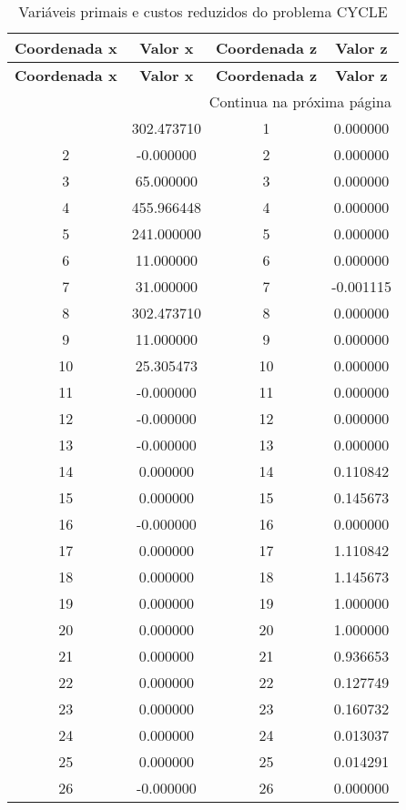 \documentclass[12pt]{article}
\begin{document}
\begin{longtable}{@{}cccc@{}}
\caption{Variáveis primais e custos reduzidos do problema CYCLE} \\
\toprule
\textbf{Coordenada x} & \textbf{Valor x} & \textbf{Coordenada z} & \textbf{Valor z} \\
\midrule
\endfirsthead

\toprule
\textbf{Coordenada x} & \textbf{Valor x} & \textbf{Coordenada z} & \textbf{Valor z} \\
\midrule
\endhead

\midrule \multicolumn{4}{r}{{Continua na próxima página}} \\ \midrule
\endfoot

\bottomrule
\endlastfoot
1 & 302.473710 & 1 & 0.000000 \\
2 & -0.000000 & 2 & 0.000000 \\
3 & 65.000000 & 3 & 0.000000 \\
4 & 455.966448 & 4 & 0.000000 \\
5 & 241.000000 & 5 & 0.000000 \\
6 & 11.000000 & 6 & 0.000000 \\
7 & 31.000000 & 7 & -0.001115 \\
8 & 302.473710 & 8 & 0.000000 \\
9 & 11.000000 & 9 & 0.000000 \\
10 & 25.305473 & 10 & 0.000000 \\
11 & -0.000000 & 11 & 0.000000 \\
12 & -0.000000 & 12 & 0.000000 \\
13 & -0.000000 & 13 & 0.000000 \\
14 & 0.000000 & 14 & 0.110842 \\
15 & 0.000000 & 15 & 0.145673 \\
16 & -0.000000 & 16 & 0.000000 \\
17 & 0.000000 & 17 & 1.110842 \\
18 & 0.000000 & 18 & 1.145673 \\
19 & 0.000000 & 19 & 1.000000 \\
20 & 0.000000 & 20 & 1.000000 \\
21 & 0.000000 & 21 & 0.936653 \\
22 & 0.000000 & 22 & 0.127749 \\
23 & 0.000000 & 23 & 0.160732 \\
24 & 0.000000 & 24 & 0.013037 \\
25 & 0.000000 & 25 & 0.014291 \\
26 & -0.000000 & 26 & 0.000000 \\

\end{longtable}
\end{document}
